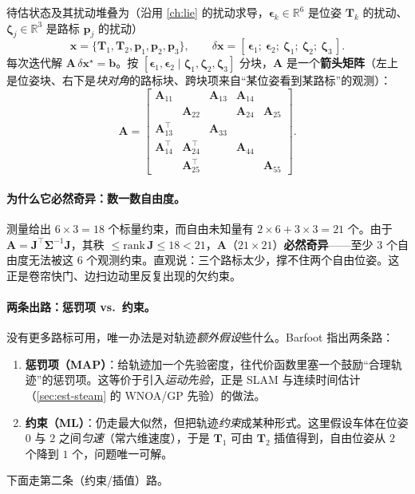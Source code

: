 待估状态及其扰动堆叠为（沿用 \cref{ch:lie} 的扰动求导，$\boldsymbol\epsilon_k\in\mathbb{R}^6$ 是位姿 $\mathbf{T}_k$ 的扰动、$\boldsymbol\zeta_j\in\mathbb{R}^3$ 是路标 $\mathbf{p}_j$ 的扰动）
\begin{equation}
\mathbf{x}=\{\mathbf{T}_1,\mathbf{T}_2,\mathbf{p}_1,\mathbf{p}_2,\mathbf{p}_3\},\qquad
\delta\mathbf{x}=[\,\boldsymbol\epsilon_1;\ \boldsymbol\epsilon_2;\ \boldsymbol\zeta_1;\ \boldsymbol\zeta_2;\ \boldsymbol\zeta_3\,].
\label{eq:sys-interp-state}
\end{equation}
每次迭代解 $\mathbf{A}\,\delta\mathbf{x}^\star=\mathbf{b}$。按 $[\boldsymbol\epsilon_1,\boldsymbol\epsilon_2\mid\boldsymbol\zeta_1,\boldsymbol\zeta_2,\boldsymbol\zeta_3]$ 分块，$\mathbf{A}$ 是一个\textbf{箭头矩阵}（左上是位姿块、右下是\emph{块对角}的路标块、跨块项来自“某位姿看到某路标”的观测）：
\begin{equation}
\mathbf{A}=
\begin{bmatrix}
\mathbf{A}_{11} & & \mathbf{A}_{13} & \mathbf{A}_{14} & \\
 & \mathbf{A}_{22} & & \mathbf{A}_{24} & \mathbf{A}_{25}\\
\mathbf{A}_{13}^\top & & \mathbf{A}_{33} & & \\
\mathbf{A}_{14}^\top & \mathbf{A}_{24}^\top & & \mathbf{A}_{44} & \\
 & \mathbf{A}_{25}^\top & & & \mathbf{A}_{55}
\end{bmatrix}.
\label{eq:sys-interp-A}
\end{equation}

\paragraph{为什么它必然奇异：数一数自由度。}
测量给出 $6\times3=18$ 个标量约束，而自由未知量有 $2\times6+3\times3=21$ 个。由于 $\mathbf{A}=\mathbf{J}^\top\boldsymbol\Sigma^{-1}\mathbf{J}$，其秩 $\le\mathrm{rank}\,\mathbf{J}\le 18<21$，$\mathbf{A}$（$21\times21$）\textbf{必然奇异}——至少 $3$ 个自由度无法被这 $6$ 个观测约束。直观说：三个路标太少，撑不住两个自由位姿。这正是卷帘快门、边扫边动里反复出现的欠约束。

\paragraph{两条出路：惩罚项 vs.\ 约束。}
没有更多路标可用，唯一办法是对轨迹\emph{额外假设}些什么。Barfoot 指出两条路：
\begin{enumerate}
  \item \textbf{惩罚项（MAP）}：给轨迹加一个先验密度，往代价函数里塞一个鼓励“合理轨迹”的惩罚项。这等价于引入\emph{运动先验}，正是 SLAM 与连续时间估计（\cref{sec:est-steam} 的 WNOA/GP 先验）的做法。
  \item \textbf{约束（ML）}：仍走最大似然，但把轨迹\emph{约束}成某种形式。这里假设车体在位姿 $0$ 与 $2$ 之间\emph{匀速}（常六维速度），于是 $\mathbf{T}_1$ 可由 $\mathbf{T}_2$ 插值得到，自由位姿从 $2$ 个降到 $1$ 个，问题唯一可解。
\end{enumerate}
下面走第二条（约束/插值）路。

